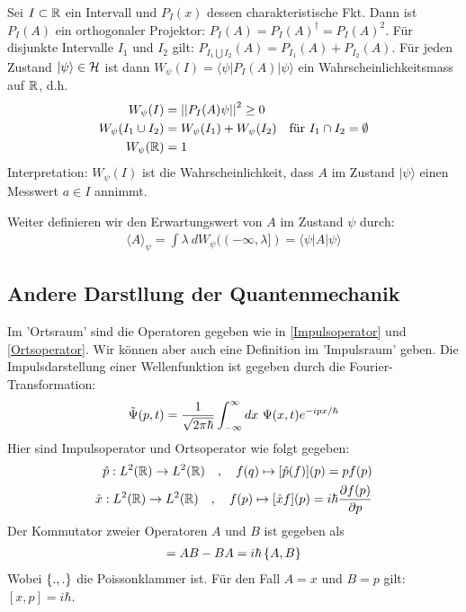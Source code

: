 Sei $I \subset \mathbb{R}$ ein Intervall und $P_I(x)$ dessen charakteristische Fkt.
Dann ist $P_I (A)$ ein orthogonaler Projektor: $P_I (A) = P_I(A)^\dagger
= P_I (A)^2$. Für disjunkte Intervalle $I_1$ und $I_2$ gilt:
$P_{I_1 \bigcup I_2} (A) = P_{I_1} (A) + P_{I_2}(A)$. Für jeden Zustand $| \psi \rangle
\in \mathcal{H}$ ist dann $W_{\psi} (I) = \langle \psi | P_I (A) | \psi \rangle$ ein
Wahrscheinlichkeitsmass auf $\mathbb{R}$, d.h.
\begin{align*}
    W_{\psi}(I) &= \left\vert\left\vert P_I(A) \psi \right\vert\right\vert^2 \geq 0
    \\
    W_{\psi} (I_1 \cup I_2) &= W_{\psi} (I_1) + W_\psi (I_2)
    \hspace{10pt} \text{für } I_1 \cap I_2 = \emptyset
    \\
    W_{\psi} (\mathbb{R}) &= 1
\end{align*}
Interpretation: $W_\psi(I)$ ist die Wahrscheinlichkeit, dass $A$ im Zustand
$| \psi \rangle$ einen Messwert $a \in I$ annimmt.

Weiter definieren wir den Erwartungswert von $A$ im Zustand $\psi$ durch:
\begin{align*}
    \langle A \rangle_\psi = \int \lambda \ dW_\psi ((-\infty,\lambda])
    = \langle \psi | A | \psi \rangle
\end{align*}

\subsection{Andere Darstllung der Quantenmechanik}

Im 'Ortsraum' sind die Operatoren gegeben wie in \cref{Impulsoperator} und
\cref{Ortsoperator}. Wir können aber auch eine Definition im 'Impulsraum' geben.
Die Impulsdarstellung einer Wellenfunktion ist gegeben durch die
Fourier-Transformation:
\begin{align*}
    \tilde{\Psi} (p,t) = \frac{1}{\sqrt{2 \pi \hbar}} \intii dx \ \Psi(x,t) e^{-i p x / \hbar}
\end{align*}
Hier sind Impulsoperator und Ortsoperator wie folgt gegeben:
\begin{align*}
    \hat{p}: L^2(\mathbb{R}) \rightarrow L^2(\mathbb{R})
    \hspace{10pt} , \hspace{10pt}
    f(q) \mapsto [\hat{p}(f)](p) = p f(p)
    \\
    \hat{x}: L^2(\mathbb{R}) \rightarrow L^2 (\mathbb{R})
    \hspace{10pt} , \hspace{10pt}
    f(p) \mapsto [\hat{x} f](p) = i \hbar \frac{\partial f(p)}{\partial p}
\end{align*}
Der Kommutator zweier Operatoren $A$ und $B$ ist gegeben als
\begin{align*}
    [A,B] = A B - B A = i \hbar \geschwungeneklammer{A,B}
\end{align*}
Wobei $\left\{ .,. \right\}$ die Poissonklammer ist.
Für den Fall $A=x$ und $B=p$ gilt: $[x,p] = i \hbar$.
